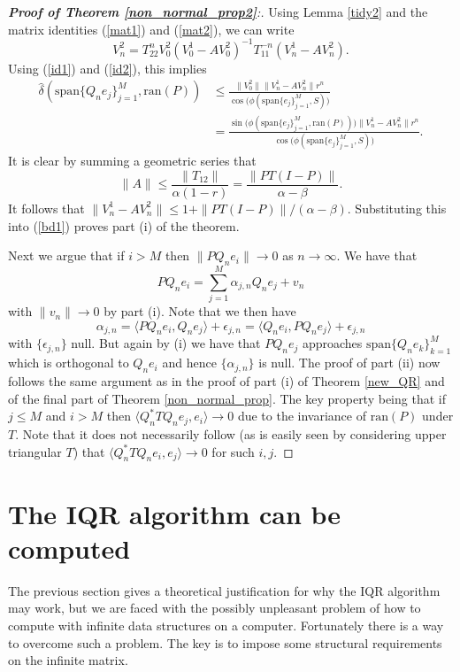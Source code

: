 \documentclass[a4paper,10pt]{article}
\begin{document}
\begin{proof}[\textbf{Proof of Theorem \ref{non_normal_prop2}}:]
Using Lemma \ref{tidy2} and the matrix identities (\ref{mat1}) and (\ref{mat2}), we can write
$$
V_n^2=T_{22}^nV_0^2(V_0^1-AV_0^2)^{-1}T_{11}^{-n}(V_n^1-AV_n^2).
$$
Using (\ref{id1}) and (\ref{id2}), this implies
\begin{equation}
\label{bd1}
\begin{split}
\hat\delta (\mathrm{span}\{Q_n e_j\}_{j=1}^M,\mathrm{ran}(P))&\leq \frac{\|V_0^2\|\|V_n^1-AV_n^2\|r^n}{\cos\big(\phi(\mathrm{span}\{e_j\}_{j=1}^M,S)\big)}\\
&=\frac{\sin\big(\phi(\mathrm{span}\{e_j\}_{j=1}^M,\mathrm{ran}(P))\big)\|V_n^1-AV_n^2\|r^n}{\cos\big(\phi(\mathrm{span}\{e_j\}_{j=1}^M,S)\big)}.
\end{split}
\end{equation}
It is clear by summing a geometric series that
$$
\|A\|\leq \frac{\|T_{12}\|}{\alpha(1-r)}=\frac{\|PT(I-P)\|}{\alpha-\beta}.
$$
It follows that $\|V_n^1-AV_n^2\|\leq 1+\|PT(I-P)\|/(\alpha-\beta)$. Substituting this into (\ref{bd1}) proves part (i) of the theorem.

Next we argue that if $i>M$ then $\|PQ_ne_i\|\rightarrow 0$ as $n\rightarrow\infty$. We have that
$$
PQ_ne_i=\sum_{j=1}^M\alpha_{j,n}Q_ne_j+v_n
$$
with $\|v_n\|\rightarrow 0$ by part (i). Note that we then have
$$
\alpha_{j,n}=\langle PQ_ne_i, Q_ne_j \rangle +\epsilon_{j,n}=\langle Q_ne_i, PQ_ne_j \rangle +\epsilon_{j,n}
$$
with $\{\epsilon_{j,n}\}$ null. But again by (i) we have that $PQ_ne_j$ approaches $\mathrm{span}\{Q_ne_k\}_{k=1}^M$ which is orthogonal to $Q_ne_i$ and hence $\{\alpha_{j,n}\}$ is null. The proof of part (ii) now follows the same argument as in the proof of part (i) of Theorem \ref{new_QR} and of the final part of Theorem \ref{non_normal_prop}. The key property being that if $j\leq M$ and $i>M$ then $\langle Q_n^*TQ_ne_j,e_i\rangle\rightarrow 0$ due to the invariance of $\mathrm{ran}(P)$ under $T$. Note that it does not necessarily follow (as is easily seen by considering upper triangular $T$) that $\langle Q_n^*TQ_ne_i,e_j\rangle\rightarrow 0$ for such $i,j$.
\end{proof}


\section{The IQR algorithm can be computed}\label{implement}


The previous section gives a theoretical justification for why the IQR algorithm may work, but we are faced with the possibly unpleasant problem of how to compute with infinite data structures on a computer. Fortunately there is a way to overcome such a problem. The key is to impose some structural requirements on the infinite matrix.
\end{document}
